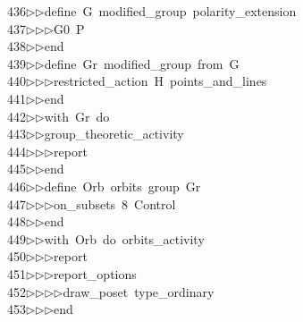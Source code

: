\begin{tabbing}
436\>$\triangleright$\>$\triangleright$\>define\ G\ modified\_group\ polarity\_extension\ \\[0pt]
437\>$\triangleright$\>$\triangleright$\>$\triangleright$\>G0\ P\ \\[0pt]
438\>$\triangleright$\>$\triangleright$\>end\ \\[0pt]
439\>$\triangleright$\>$\triangleright$\>define\ Gr\ modified\_group\ from\ G\ \\[0pt]
440\>$\triangleright$\>$\triangleright$\>$\triangleright$\>restricted\_action\ H\ points\_and\_lines\ \\[0pt]
441\>$\triangleright$\>$\triangleright$\>end\ \\[0pt]
442\>$\triangleright$\>$\triangleright$\>with\ Gr\ do\ \\[0pt]
443\>$\triangleright$\>$\triangleright$\>group\_theoretic\_activity\ \\[0pt]
444\>$\triangleright$\>$\triangleright$\>$\triangleright$\>report\ \\[0pt]
445\>$\triangleright$\>$\triangleright$\>end\ \\[0pt]
446\>$\triangleright$\>$\triangleright$\>define\ Orb\ orbits\ group\ Gr\ \\[0pt]
447\>$\triangleright$\>$\triangleright$\>$\triangleright$\>on\_subsets\ 8\ Control\ \\[0pt]
448\>$\triangleright$\>$\triangleright$\>end\ \\[0pt]
449\>$\triangleright$\>$\triangleright$\>with\ Orb\ do\ orbits\_activity\ \\[0pt]
450\>$\triangleright$\>$\triangleright$\>$\triangleright$\>report\ \\[0pt]
451\>$\triangleright$\>$\triangleright$\>$\triangleright$\>report\_options\ \\[0pt]
452\>$\triangleright$\>$\triangleright$\>$\triangleright$\>$\triangleright$\>draw\_poset\ type\_ordinary\ \\[0pt]
453\>$\triangleright$\>$\triangleright$\>$\triangleright$\>end\ \\[0pt]

\end{tabbing}
